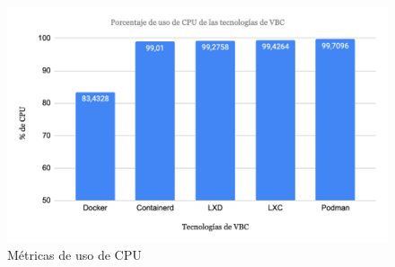 \begin{figure}[H]
    \centering
    \includegraphics[width=\textwidth] {tablas-images/cp4/cpu.png}
    \caption{Métricas de uso de CPU}\label{fig:tabla-metricas-cpu}
\end{figure}